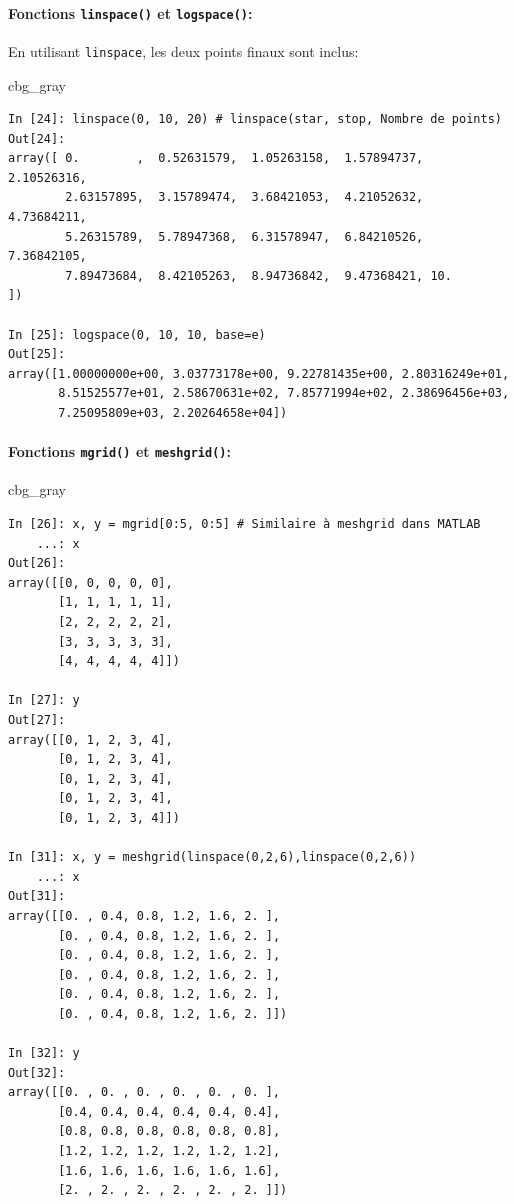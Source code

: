 \documentclass[%
oneside,                 %
final,                   %
10pt,french]{article}
\newenvironment{_cod_tight}[1]{
   \def\FrameCommand{\colorbox{#1}}
   \FrameRule0.6pt\MakeFramed {\FrameRestore}\vskip3mm}
   {\vskip0mm\endMakeFramed}
\newenvironment{cod}[1]{
\bgroup\rmfamily
\fboxsep=0mm\relax
\begin{_cod_tight}{#1}
\list{}{\parsep=-2mm\parskip=0mm\topsep=0pt\leftmargin=2mm
\rightmargin=2\leftmargin\leftmargin=4pt\relax}
\item\relax}
{\endlist\end{_cod_tight}\egroup}
\begin{document}
\paragraph{Fonctions \texttt{linspace()} et \texttt{logspace()}:}

En utilisant \texttt{linspace}, les deux points finaux sont inclus:
\begin{cod}{cbg_gray}\begin{verbatim}
In [24]: linspace(0, 10, 20) # linspace(star, stop, Nombre de points)
Out[24]:
array([ 0.        ,  0.52631579,  1.05263158,  1.57894737,  2.10526316,
        2.63157895,  3.15789474,  3.68421053,  4.21052632,  4.73684211,
        5.26315789,  5.78947368,  6.31578947,  6.84210526,  7.36842105,
        7.89473684,  8.42105263,  8.94736842,  9.47368421, 10.        ])

In [25]: logspace(0, 10, 10, base=e)
Out[25]:
array([1.00000000e+00, 3.03773178e+00, 9.22781435e+00, 2.80316249e+01,
       8.51525577e+01, 2.58670631e+02, 7.85771994e+02, 2.38696456e+03,
       7.25095809e+03, 2.20264658e+04])
\end{verbatim}
\end{cod}
\noindent

\paragraph{Fonctions \texttt{mgrid()} et \texttt{meshgrid()}:}

\begin{cod}{cbg_gray}\begin{verbatim}
In [26]: x, y = mgrid[0:5, 0:5] # Similaire à meshgrid dans MATLAB
    ...: x
Out[26]:
array([[0, 0, 0, 0, 0],
       [1, 1, 1, 1, 1],
       [2, 2, 2, 2, 2],
       [3, 3, 3, 3, 3],
       [4, 4, 4, 4, 4]])

In [27]: y
Out[27]:
array([[0, 1, 2, 3, 4],
       [0, 1, 2, 3, 4],
       [0, 1, 2, 3, 4],
       [0, 1, 2, 3, 4],
       [0, 1, 2, 3, 4]])

In [31]: x, y = meshgrid(linspace(0,2,6),linspace(0,2,6))
    ...: x
Out[31]:
array([[0. , 0.4, 0.8, 1.2, 1.6, 2. ],
       [0. , 0.4, 0.8, 1.2, 1.6, 2. ],
       [0. , 0.4, 0.8, 1.2, 1.6, 2. ],
       [0. , 0.4, 0.8, 1.2, 1.6, 2. ],
       [0. , 0.4, 0.8, 1.2, 1.6, 2. ],
       [0. , 0.4, 0.8, 1.2, 1.6, 2. ]])

In [32]: y
Out[32]:
array([[0. , 0. , 0. , 0. , 0. , 0. ],
       [0.4, 0.4, 0.4, 0.4, 0.4, 0.4],
       [0.8, 0.8, 0.8, 0.8, 0.8, 0.8],
       [1.2, 1.2, 1.2, 1.2, 1.2, 1.2],
       [1.6, 1.6, 1.6, 1.6, 1.6, 1.6],
       [2. , 2. , 2. , 2. , 2. , 2. ]])
\end{verbatim}
\end{cod}
\noindent
\end{document}
